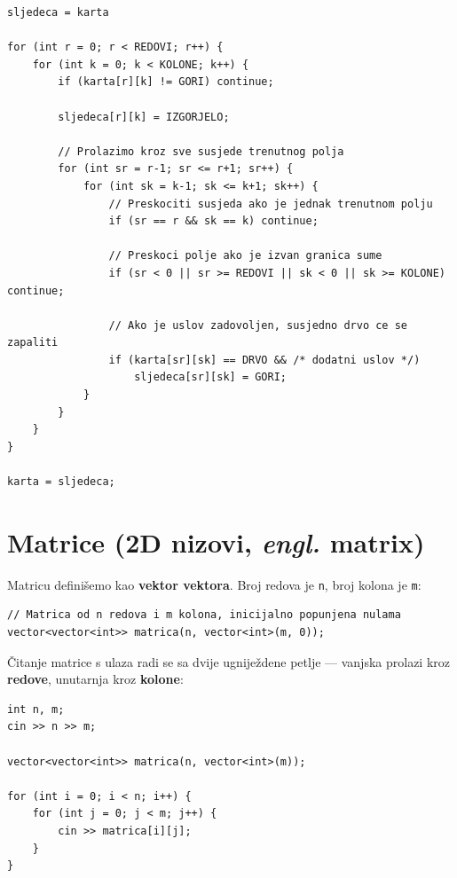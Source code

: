 \documentclass[11pt]{article}
\begin{document}
\begin{lstlisting}
sljedeca = karta

for (int r = 0; r < REDOVI; r++) {
    for (int k = 0; k < KOLONE; k++) {
        if (karta[r][k] != GORI) continue;

        sljedeca[r][k] = IZGORJELO;

        // Prolazimo kroz sve susjede trenutnog polja
        for (int sr = r-1; sr <= r+1; sr++) {
            for (int sk = k-1; sk <= k+1; sk++) {
                // Preskociti susjeda ako je jednak trenutnom polju
                if (sr == r && sk == k) continue;
                
                // Preskoci polje ako je izvan granica sume
                if (sr < 0 || sr >= REDOVI || sk < 0 || sk >= KOLONE) continue;
                
                // Ako je uslov zadovoljen, susjedno drvo ce se zapaliti
                if (karta[sr][sk] == DRVO && /* dodatni uslov */)
                    sljedeca[sr][sk] = GORI;
            }
        }
    }
}

karta = sljedeca;
\end{lstlisting}



\newpage

\section*{Matrice (2D nizovi, \textit{engl.} matrix)}

Matricu definišemo kao \textbf{vektor vektora}. Broj redova je \texttt{n},
broj kolona je \texttt{m}:

\begin{lstlisting}
// Matrica od n redova i m kolona, inicijalno popunjena nulama
vector<vector<int>> matrica(n, vector<int>(m, 0));
\end{lstlisting}

\medskip
Čitanje matrice s ulaza radi se sa dvije ugniježdene petlje —
vanjska prolazi kroz \textbf{redove}, unutarnja kroz \textbf{kolone}:

\begin{lstlisting}
int n, m;
cin >> n >> m;

vector<vector<int>> matrica(n, vector<int>(m));

for (int i = 0; i < n; i++) {
    for (int j = 0; j < m; j++) {
        cin >> matrica[i][j];
    }
}
\end{lstlisting}
\end{document}
